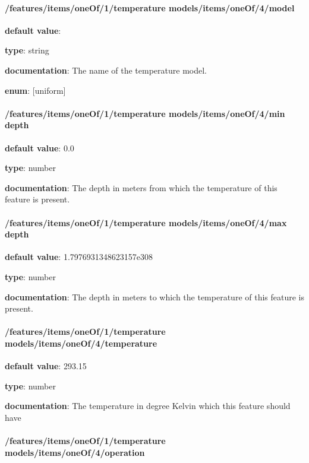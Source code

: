 \paragraph{/features/items/oneOf/1/temperature models/items/oneOf/4/model} \begin{itemized}
\item {\bf default value}: 
\item {\bf type}: string
\item {\bf documentation}: The name of the temperature model.
\item {\bf enum}: [uniform]\end{itemized}\paragraph{/features/items/oneOf/1/temperature models/items/oneOf/4/min depth} \begin{itemized}
\item {\bf default value}: 0.0
\item {\bf type}: number
\item {\bf documentation}: The depth in meters from which the temperature of this feature is present.
\end{itemized}\paragraph{/features/items/oneOf/1/temperature models/items/oneOf/4/max depth} \begin{itemized}
\item {\bf default value}: 1.7976931348623157e308
\item {\bf type}: number
\item {\bf documentation}: The depth in meters to which the temperature of this feature is present.
\end{itemized}\paragraph{/features/items/oneOf/1/temperature models/items/oneOf/4/temperature} \begin{itemized}
\item {\bf default value}: 293.15
\item {\bf type}: number
\item {\bf documentation}: The temperature in degree Kelvin which this feature should have
\end{itemized}\paragraph{/features/items/oneOf/1/temperature models/items/oneOf/4/operation} \begin{itemized}

\end{itemized}
